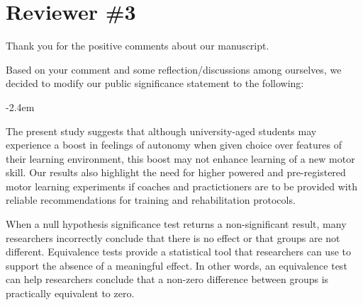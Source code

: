 \documentclass[final]{article}
\renewenvironment{quote}{\begin{fquote}\advance\leftmargini -2.4em\begin{oldquote}}{\end{oldquote}\end{fquote}}
\newenvironment{fquote}
  {\def\FrameCommand{
	\fboxsep=0.6em %
	\fcolorbox{black}{white}}%
    \MakeFramed {\advance\hsize-2\width \FrameRestore}
    \begin{minipage}{\linewidth}
  }
  {\end{minipage}\endMakeFramed}
\begin{document}
\hypertarget{reviewer-3}{%
\section{Reviewer \#3}\label{reviewer-3}}


Thank you for the positive comments about our manuscript.


Based on your comment and some reflection/discussions among ourselves, we decided to modify our public significance statement to the following:

\begin{quote}
The present study suggests that although university-aged students may experience a boost in feelings of autonomy when given choice over features of their learning environment, this boost may not enhance learning of a new motor skill. Our results also highlight the need for higher powered and pre-registered motor learning experiments if coaches and practictioners are to be provided with reliable recommendations for training and rehabilitation protocols.
\end{quote}


When a null hypothesis significance test returns a non-significant result, many researchers incorrectly conclude that there is no effect or that groups are not different. Equivalence tests provide a statistical tool that researchers can use to support the absence of a meaningful effect. In other words, an equivalence test can help researchers conclude that a non-zero difference between groups is practically equivalent to zero.
\end{document}

